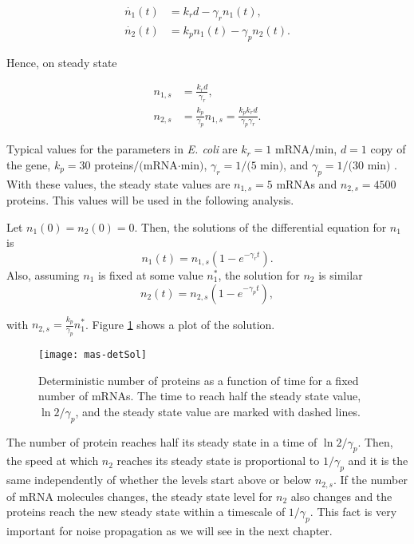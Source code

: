 \begin{equation}
  \label{eq:mas-simple_det_1}
  \begin{split}
    \dot{n_1}(t) &= k_rd-\gamma_rn_1(t),\\
    \dot{n_2}(t) &= k_pn_1(t)-\gamma_pn_2(t).
  \end{split}
\end{equation}

Hence, on steady state

\begin{equation}
  \label{eq:mas-simple_ss_1}
  \begin{split}
    n_{1,s} &= \frac{k_rd}{\gamma_r}, \\
    n_{2,s} &= \frac{k_p}{\gamma_p} n_{1,s} = \frac{k_pk_rd}{\gamma_p\gamma_r}.
  \end{split}
\end{equation}

Typical values for the parameters in \textit{E. coli} are $k_r = 1$ mRNA$/$min, $d=1$ copy of the gene, $k_p = 30$ proteins$/($mRNA$\cdot$min$)$, $\gamma_r = 1/(5$ min$)$, and $\gamma_p = 1/(30$ min$)$ \cite{alon06}. With these values, the steady state values are $n_{1,s}=5$ mRNAs and $n_{2,s}=4500$ proteins. This values will be used in the following analysis.

Let $n_1(0) = n_2(0) = 0$. Then, the solutions of the differential equation for $n_1$ is
\begin{equation*}
  n_1(t) = n_{1,s}\left(1-e^{-\gamma_rt}\right).
\end{equation*}
Also, assuming $n_1$ is fixed at some value $n_1^*$, the solution for $n_2$ is similar
\begin{equation*}
  n_2(t) = n_{2,s}\left(1-e^{-\gamma_pt}\right),
\end{equation*}

with $n_{2,s}=\frac{k_p}{\gamma_p}n_1^*$. Figure \ref{fig:mas-detSol} shows a plot of the solution.

\begin{figure}[H]
  \centering
  \texttt{[image: mas-detSol]}
  \caption[Deterministic equation for the number of proteins in a single gene]{\label{fig:mas-detSol} Deterministic number of proteins as a function of time for a fixed number of mRNAs. The time to reach half the steady state value, $\ln 2/\gamma_p$, and the steady state value are marked with dashed lines.}
\end{figure}

The number of protein reaches half its steady state in a time of $\ln 2/\gamma_p$. Then, the speed at which $n_2$ reaches its steady state is proportional to $1/\gamma_p$ and it is the same independently of whether the levels start above or below $n_{2,s}$. If the number of mRNA molecules changes, the steady state level for $n_2$ also changes and the proteins reach the new steady state within a timescale of $1/\gamma_p$. This fact is very important for noise propagation as we will see in the next chapter.

